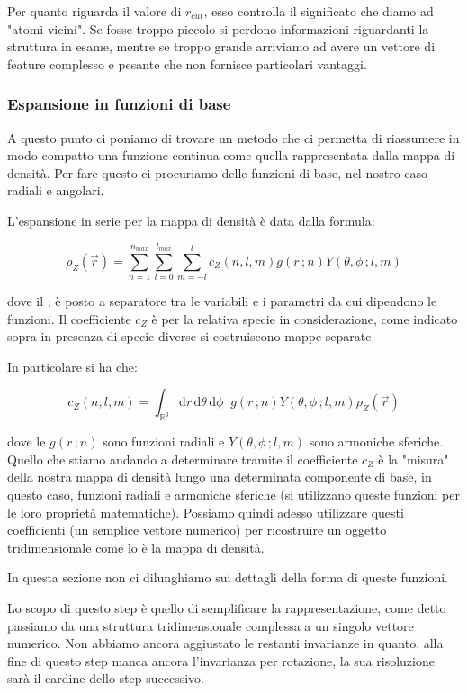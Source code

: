 \documentclass[a4paper,11pt,openany]{book}
\begin{document}
Per quanto riguarda il valore di $r_{cut}$, esso controlla il significato che diamo ad "atomi vicini". Se fosse troppo piccolo si perdono informazioni riguardanti la struttura in esame, mentre se troppo grande arriviamo ad avere un vettore di feature complesso e pesante che non fornisce particolari vantaggi.

\subsubsection{Espansione in funzioni di base}
A questo punto ci poniamo di trovare un metodo che ci permetta di riassumere in modo compatto una funzione continua come quella rappresentata dalla mappa di densità. Per fare questo ci procuriamo delle funzioni di base, nel nostro caso radiali e angolari.

L'espansione in serie per la mappa di densità è data dalla formula:

\begin{equation}
    \rho_Z(\vec{r}) = \sum_{n=1}^{n_{max}} \sum_{l=0}^{l_{max}} \sum_{m=-l}^{l} c_Z(n,l,m) g(r \,;n) Y(\theta, \phi \,; l,m)
\end{equation}

dove il ; è posto a separatore tra le variabili e i parametri da cui dipendono le funzioni. Il coefficiente $c_Z$ è per la relativa specie in considerazione, come indicato sopra in presenza di specie diverse si costruiscono mappe separate.

In particolare si ha che:

\begin{equation}
    c_Z(n,l,m) = \int_{\mathbb{R}^3} \mathrm{d}r\, \mathrm{d}\theta\, \mathrm{d}\phi \;\; g(r \,;n) Y(\theta, \phi \,; l,m) \rho_Z(\vec{r}) 
\end{equation}

dove le $g(r \,;n)$ sono funzioni radiali e $Y(\theta, \phi \,; l,m)$ sono armoniche sferiche. Quello che stiamo andando a determinare tramite il coefficiente $c_Z$ è la "misura" della nostra mappa di densità lungo una determinata componente di base, in questo caso, funzioni radiali e armoniche sferiche (si utilizzano queste funzioni per le loro proprietà matematiche). Possiamo quindi adesso utilizzare questi coefficienti (un semplice vettore numerico) per ricostruire un oggetto tridimensionale come lo è la mappa di densità. 

In questa sezione non ci dilunghiamo sui dettagli della forma di queste funzioni.

Lo scopo di questo step è quello di semplificare la rappresentazione, come detto passiamo da una struttura tridimensionale complessa a un singolo vettore numerico. Non abbiamo ancora aggiustato le restanti invarianze in quanto, alla fine di questo step manca ancora l'invarianza per rotazione, la sua risoluzione sarà il cardine dello step successivo.
\end{document}
